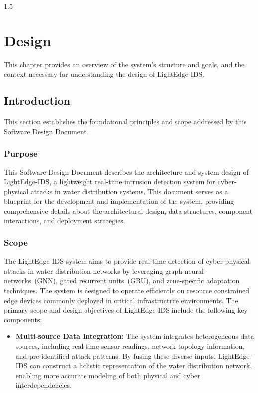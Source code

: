 
\newpage
\thispagestyle{empty}
%
\begin{spacing}{1.5}

\chapter{Design}
This chapter provides an overview of the system's structure and goals, and the context necessary for understanding the design of LightEdge-IDS.

\section{Introduction}

This section establishes the foundational principles and scope addressed by this Software Design Document.

\subsection{Purpose}
This Software Design Document describes the architecture and system design of LightEdge-IDS, a lightweight real-time intrusion detection system for cyber-physical attacks in water distribution systems. This document serves as a blueprint for the development and implementation of the system, providing comprehensive details about the architectural design, data structures, component interactions, and deployment strategies. 

\subsection{Scope}
The LightEdge-IDS system aims to provide real-time detection of cyber-physical attacks in water distribution networks by leveraging graph neural networks~(GNN), gated recurrent units~(GRU), and zone-specific adaptation techniques. The
system is designed to operate efficiently on resource constrained edge devices commonly deployed in critical infrastructure environments. The primary scope and design objectives of LightEdge-IDS include the following key components:

\begin{itemize}
    \item \textbf{Multi-source Data Integration:}  
    The system integrates heterogeneous data sources, including real-time sensor readings, network topology information, and pre-identified attack patterns. By fusing these diverse inputs, LightEdge-IDS can construct a holistic representation of the water distribution network, enabling more accurate modeling of both physical and cyber interdependencies.


\end{itemize}
\end{spacing}
